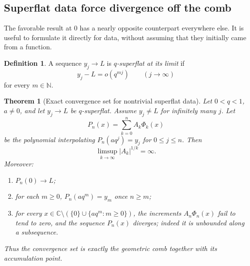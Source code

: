 \documentclass[11pt,a4paper,oneside]{article}
\newtheorem{theorem}{Theorem}[section]
\theoremstyle{definition}
\newtheorem{definition}[definition]{Definition}
\theoremstyle{remark}
\newcommand{\C}{\mathbb C}
\newcommand{\N}{\mathbb N}
\begin{document}
\subsection{Superflat data force divergence off the comb}

The favorable result at $0$ has a nearly opposite counterpart everywhere
else.  It is useful to formulate it directly for data, without assuming that
they initially came from a function.

\begin{definition}
A sequence $y_j\to L$ is \emph{$q$-superflat at its limit} if
\begin{equation}
 y_j-L=o(q^{mj})\qquad(j\to\infty)
 \label{eq:q-superflat}
\end{equation}
for every $m\in\N$.
\end{definition}

\begin{theorem}[Exact convergence set for nontrivial superflat data]
\label{thm:superflat-divergence}
Let $0<q<1$, $a\ne0$, and let $y_j\to L$ be $q$-superflat.  Assume
$y_j\ne L$ for infinitely many $j$.  Let
\begin{equation}
 P_n(x)=\sum_{k=0}^n A_k\Phi_k(x)
 \label{eq:superflat-newton}
\end{equation}
be the polynomial interpolating $P_n(aq^j)=y_j$ for $0\le j\le n$.  Then
\begin{equation}
 \limsup_{k\to\infty}|A_k|^{1/k}=\infty.
 \label{eq:superexponential-A}
\end{equation}
Moreover:
\begin{enumerate}
\item $P_n(0)\to L$;
\item for each $m\ge0$, $P_n(aq^m)=y_m$ once $n\ge m$;
\item for every $x\in\C\setminus(\{0\}\cup\{aq^m:m\ge0\})$, the increments
      $A_n\Phi_n(x)$ fail to tend to zero, and the sequence $P_n(x)$ diverges;
      indeed it is unbounded along a subsequence.
\end{enumerate}
Thus the convergence set is exactly the geometric comb together with its
accumulation point.
\end{theorem}
\end{document}
